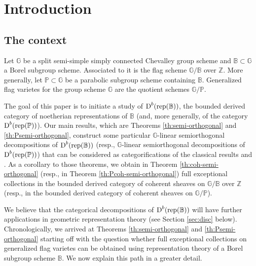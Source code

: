 \documentclass[sn-mathphys-num]{sn-jnl}%
\newcommand{\rep}{{\mathrm{rep}}}
\newcommand*{\Dd}{\mathop{\mathrm D\kern0pt}\nolimits}
\newcommand{\Gm}{\mathbb G}
\newcommand{\Bm}{\mathbb B}
\newcommand{\Pm}{\mathbb P}
\theoremstyle{definition}
\begin{document}

\maketitle

\tableofcontents

\section{Introduction}

\subsection{The context}
Let $\Gm$ be a split semi-simple simply connected Chevalley group scheme and $\Bm\subset \Gm$ a Borel subgroup scheme. 
Associated to it is the flag scheme $\Gm/\Bm$ over $\mathbb Z$. More generally, let $\Pm\subset \Gm$ be a parabolic subgroup scheme containing $\Bm$. Generalized flag varietes for the group scheme $\Gm$ are the quotient schemes
$\Gm/\Pm$.

The goal of this paper is to initiate a study of $\Dd ^b(\rep (\Bm))$, the bounded derived category of noetherian representations of $\Bm$ (and, more generally, of the category $\Dd ^b(\rep (\Pm))$). Our main results, which are Theorems \ref{th:semi-orthogonal} and \ref{th:Psemi-orthogonal}, construct some particular $\Gm$-linear semiorthogonal decompositions of $\Dd ^b(\rep (\Bm))$ (resp., $\Gm$-linear semiorthogonal decompositions of $\Dd ^b(\rep (\Pm))$) that can be considered as categorifications of the classical results 
\cite{BGG} and \cite{Dem}. As a corollary to those theorems, we obtain in Theorem \ref{th:coh-semi-orthogonal} (resp., in Theorem \ref{th:Pcoh-semi-orthogonal}) full exceptional collections in the bounded derived category of coherent sheaves on $\Gm/\Bm$ over $\mathbb Z$ (resp., in the bounded derived category of coherent sheaves on $\Gm/\Pm$). 

We believe that the categorical decompositions of $\Dd ^b(\rep (\Bm))$ will have further applications in geometric representation theory (see Section \ref{sec:disc} below). Chronologically, we arrived at Theorems \ref{th:semi-orthogonal} and \ref{th:Psemi-orthogonal} starting off with the question whether full exceptional collections on generalized flag varietes can be obtained using representation theory of a Borel subgroup scheme $\Bm$. We now explain this path in a greater detail.
\end{document}
